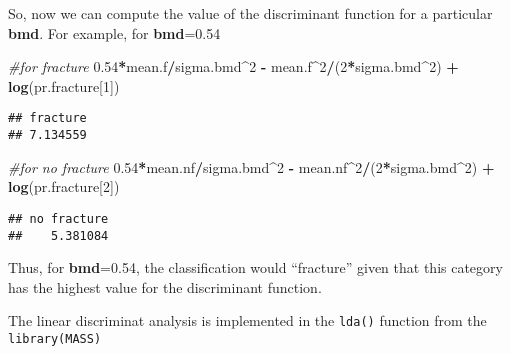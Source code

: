 \documentclass[
]{book}
\newenvironment{Shaded}{\begin{snugshade}}{\end{snugshade}}
\newcommand{\AttributeTok}[1]{\textcolor[rgb]{0.13,0.29,0.53}{#1}}
\newcommand{\CommentTok}[1]{\textcolor[rgb]{0.56,0.35,0.01}{\textit{#1}}}
\newcommand{\DecValTok}[1]{\textcolor[rgb]{0.00,0.00,0.81}{#1}}
\newcommand{\FloatTok}[1]{\textcolor[rgb]{0.00,0.00,0.81}{#1}}
\newcommand{\FunctionTok}[1]{\textcolor[rgb]{0.13,0.29,0.53}{\textbf{#1}}}
\newcommand{\NormalTok}[1]{#1}
\newcommand{\OtherTok}[1]{\textcolor[rgb]{0.56,0.35,0.01}{#1}}
\newcommand{\SpecialCharTok}[1]{\textcolor[rgb]{0.81,0.36,0.00}{\textbf{#1}}}
\begin{document}
So, now we can compute the value of the discriminant function for a particular
\textbf{bmd}. For example, for \textbf{bmd}=0.54

\begin{Shaded}
\begin{Highlighting}[]
\CommentTok{\#for fracture}
\FloatTok{0.54}\SpecialCharTok{*}\NormalTok{mean.f}\SpecialCharTok{/}\NormalTok{sigma.bmd}\SpecialCharTok{\^{}}\DecValTok{2} \SpecialCharTok{{-}}\NormalTok{ mean.f}\SpecialCharTok{\^{}}\DecValTok{2}\SpecialCharTok{/}\NormalTok{(}\DecValTok{2}\SpecialCharTok{*}\NormalTok{sigma.bmd}\SpecialCharTok{\^{}}\DecValTok{2}\NormalTok{) }\SpecialCharTok{+} \FunctionTok{log}\NormalTok{(pr.fracture[}\DecValTok{1}\NormalTok{])      }
\end{Highlighting}
\end{Shaded}

\begin{verbatim}
## fracture 
## 7.134559
\end{verbatim}

\begin{Shaded}
\begin{Highlighting}[]
\CommentTok{\#for no fracture}
\FloatTok{0.54}\SpecialCharTok{*}\NormalTok{mean.nf}\SpecialCharTok{/}\NormalTok{sigma.bmd}\SpecialCharTok{\^{}}\DecValTok{2} \SpecialCharTok{{-}}\NormalTok{ mean.nf}\SpecialCharTok{\^{}}\DecValTok{2}\SpecialCharTok{/}\NormalTok{(}\DecValTok{2}\SpecialCharTok{*}\NormalTok{sigma.bmd}\SpecialCharTok{\^{}}\DecValTok{2}\NormalTok{) }\SpecialCharTok{+} \FunctionTok{log}\NormalTok{(pr.fracture[}\DecValTok{2}\NormalTok{])      }
\end{Highlighting}
\end{Shaded}

\begin{verbatim}
## no fracture 
##    5.381084
\end{verbatim}

Thus, for \textbf{bmd}=0.54, the classification would ``fracture'' given that this
category has the highest value for the discriminant function.

The linear discriminat analysis is implemented in the \texttt{lda()} function
from the \texttt{library(MASS)}

\begin{Shaded}
\end{Shaded}
\end{document}
